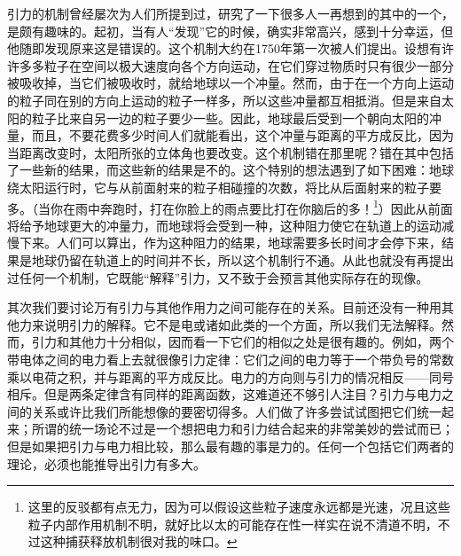 \documentclass[12pt,oneside]{book}
\begin{document}
引力的机制曾经屡次为人们所提到过，研究了一下很多人一再想到的其中的一个，是颇有趣味的。起初，当有人“发现”它的时候，确实非常高兴，感到十分幸运，但他随即发现原来这是错误的。这个机制大约在1750年第一次被人们提出。设想有许许多多粒子在空间以极大速度向各个方向运动，在它们穿过物质时只有很少一部分被吸收掉，当它们被吸收时，就给地球以一个冲量。然而，由于在一个方向上运动的粒子同在别的方向上运动的粒子一样多，所以这些冲量都互相抵消。但是来自太阳的粒子比来自另一边的粒子要少一些。因此，地球最后受到一个朝向太阳的冲量，而且，不要花费多少时间人们就能看出，这个冲量与距离的平方成反比，因为当距离改变时，太阳所张的立体角也要改变。这个机制错在那里呢？错在其中包括了一些新的结果，而这些新的结果是不的。这个特别的想法遇到了如下困难：地球绕太阳运行时，它与从前面射来的粒子相碰撞的次数，将比从后面射来的粒子要多。（当你在雨中奔跑时，打在你脸上的雨点要比打在你脑后的多！\footnote{这里的反驳都有点无力，因为可以假设这些粒子速度永远都是光速，况且这些粒子内部作用机制不明，就好比以太的可能存在性一样实在说不清道不明，不过这种捕获释放机制很对我的味口。}）因此从前面将给予地球更大的冲量力，而地球将会受到一种，这种阻力使它在轨道上的运动减慢下来。人们可以算出，作为这种阻力的结果，地球需要多长时间才会停下来，结果是地球仍留在轨道上的时间并不长，所以这个机制行不通。从此也就没有再提出过任何一个机制，它既能“解释”引力，又不致于会预言其他实际存在的现像。

其次我们要讨论万有引力与其他作用力之间可能存在的关系。目前还没有一种用其他力来说明引力的解释。它不是电或诸如此类的一个方面，所以我们无法解释。然而，引力和其他力十分相似，因而看一下它们的相似之处是很有趣的。例如，两个带电体之间的电力看上去就很像引力定律：它们之间的电力等于一个带负号的常数乘以电荷之积，并与距离的平方成反比。电力的方向则与引力的情况相反——同号相斥。但是两条定律含有同样的距离函数，这难道还不够引人注目？引力与电力之间的关系或许比我们所能想像的要密切得多。人们做了许多尝试试图把它们统一起来；所谓的统一场论不过是一个想把电力和引力结合起来的非常美妙的尝试而已；但是如果把引力与电力相比较，那么最有趣的事是力的。任何一个包括它们两者的理论，必须也能推导出引力有多大。
\end{document}
